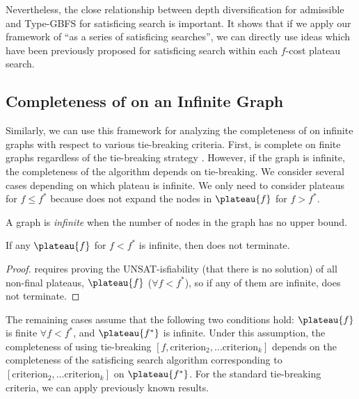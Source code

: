 Nevertheless, the close relationship between depth diversification for admissible \astar and Type-GBFS for satisficing search is important. It shows that if we apply our framework of ``\astar as a series of satisficing searches'', we can directly use ideas which have been previously proposed for satisficing search within each $f$-cost plateau search.

\subsection{Completeness of \astar on an Infinite Graph}
\label{sec:completeness-on-infinite-space}

Similarly, we can use this framework for analyzing the completeness of \astar on infinite graphs with respect to various tie-breaking criteria.
First, \astar is complete on finite graphs regardless of the tie-breaking strategy \cite{hart1968formal}.
However, if the graph is infinite, the completeness of the algorithm depends on tie-breaking.
We consider several cases depending on which plateau is infinite.
 We only need to consider plateaus for $f \leq f^*$ because  \astar does not expand the nodes in $\plateau{f}$ for $f>f^*$.

\begin{defi}
 A graph is \emph{infinite} when the number of nodes in the graph has no upper bound.
\end{defi}

\begin{propo}
 \label{propo:f-less}
 If any $\plateau{f}$ for $f<f^*$ is infinite, then \astar does not terminate.
\end{propo}

\begin{proof}
  requires proving the UNSAT-isfiability (that there is no solution) of all non-final plateaus, $\plateau{f}$ ($\forall f<f^*$), so if any of them are infinite, \astar does not terminate.
\end{proof}

The remaining cases assume that the following two conditions hold: 
 $\plateau{f}$ is finite  $\forall f<f^*$, and $\plateau{f^*}$ is infinite.
Under this assumption,
the completeness of \astar using tie-breaking $[f, \text{criterion}_2, \ldots \text{criterion}_k]$
depends on the completeness of the satisficing search algorithm corresponding to 
$[\text{criterion}_2, \ldots \text{criterion}_k]$ on $\plateau{f^*}$.
For the standard tie-breaking criteria, we can apply previously known results.

